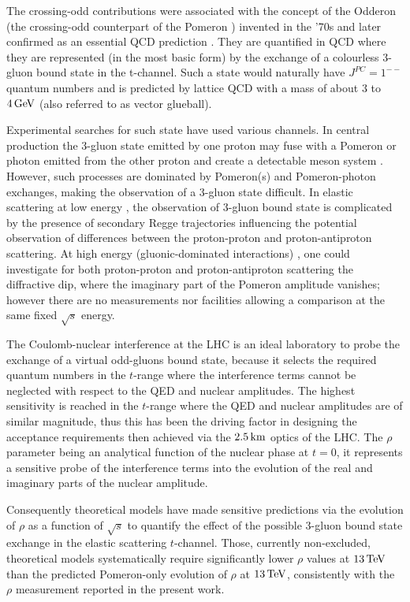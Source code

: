 The crossing-odd contributions were associated with the concept of the Odderon (the crossing-odd counterpart of the Pomeron \cite{lipatov-1986}) invented in the '70s \cite{nicolescu-1973,nicolescu-1975} and later confirmed as an essential QCD prediction \cite{bartels-1980,kwiecinski-1980,jaroszewicz-1981,ioffe-2010}. They are quantified in QCD \cite{levin-1990,durham-2018} where they are represented (in the most basic form) by the exchange of a colourless 3-gluon bound state in the t-channel. Such a state would naturally have $J^{PC}=1^{--}$ quantum numbers and is predicted by lattice QCD with a mass of about $3$ to $4\,{\rm GeV}$ (also referred to as vector glueball).

Experimental searches for such state have used various channels. In central production the 3-gluon state emitted by one proton may fuse with a Pomeron or photon emitted from the other proton and create a detectable meson system \cite{hera-odderon-2002}. However, such processes are dominated by Pomeron(s) and Pomeron-photon exchanges, making the observation of a 3-gluon state difficult. In elastic scattering at low energy \cite{breakstone-85}, the observation of 3-gluon bound state is complicated by the presence of secondary Regge trajectories influencing the potential observation of differences between the proton-proton and proton-antiproton scattering. At high energy (gluonic-dominated interactions) \cite{yellow-report}, one could investigate for both proton-proton and proton-antiproton scattering the diffractive dip, where the imaginary part of the Pomeron amplitude vanishes; however there are no measurements nor facilities allowing a comparison at the same fixed $\sqrt s$ energy.

The Coulomb-nuclear interference at the LHC is an ideal laboratory to probe the exchange of a virtual odd-gluons bound state, because it selects the required quantum numbers in the $t$-range where the interference terms cannot be neglected with respect to the QED and nuclear amplitudes. The highest sensitivity is reached in the $t$-range where the QED and nuclear amplitudes are of similar magnitude, thus this has been the driving factor in designing the acceptance requirements then achieved via the $2.5\,{\rm km}$ optics of the LHC. The $\rho$ parameter being an analytical function of the nuclear phase at $t=0$, it represents a sensitive probe of the interference terms into the evolution of the real and imaginary parts of the nuclear amplitude.

Consequently theoretical models have made sensitive predictions via the evolution of $\rho$ as a function of $\sqrt s$ to quantify the effect of the possible 3-gluon bound state exchange in the elastic scattering $t$-channel. Those, currently non-excluded, theoretical models systematically require significantly lower $\rho$ values at $13\,{\rm TeV}$ than the predicted Pomeron-only evolution of $\rho$ at $13\,{\rm TeV}$, consistently with the $\rho$ measurement reported in the present work.

